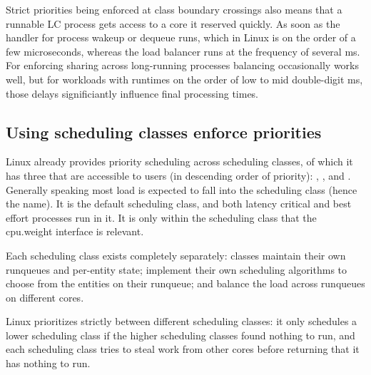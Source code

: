 Strict priorities being enforced at class boundary crossings also means that a
runnable LC process gets access to a core it reserved quickly. As soon as the
handler for process wakeup or dequeue runs, which in Linux is on the order of a
few microseconds, whereas the load balancer runs at the frequency of several ms.
For enforcing sharing across long-running processes balancing occasionally works
well, but for workloads with runtimes on the order of low to mid double-digit
ms, those delays significiantly influence final processing times.


\subsection{Using scheduling classes enforce
priorities}\label{ss:approach:linux-classes-isolate}

Linux already provides priority scheduling across scheduling classes, of which
it has three that are accessible to users (in descending order of priority):
\deadlineclass{}, \rtclass{}, and \normalclass{}. Generally speaking most load
is expected to fall into the \normalclass{} scheduling class (hence the name).
It is the default scheduling class, and both latency critical and best effort
processes run in it. It is only within the \normalclass{} scheduling class that
the \cgroups{} cpu.weight interface is relevant.

Each scheduling class exists completely separately: classes maintain their own
runqueues and per-entity state; implement their own scheduling algorithms to
choose from the entities on their runqueue; and balance the load across
runqueues on different cores. 

Linux prioritizes strictly between different scheduling classes: it only
schedules a lower scheduling class if the higher scheduling classes found
nothing to run, and each scheduling class tries to steal work from other cores
before returning that it has nothing to run.


